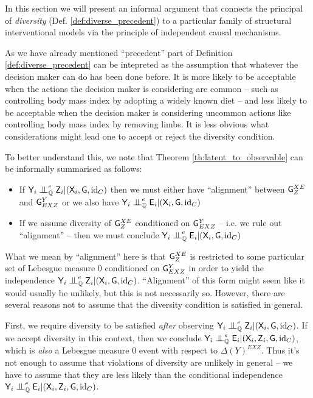 In this section we will present an informal argument that connects the principal of \emph{diversity} (Def. \ref{def:diverse_precedent}) to a particular family of structural interventional models via the principle of independent causal mechanisms.

As we have already mentioned ``precedent'' part of Definition \ref{def:diverse_precedent} can be intepreted as the assumption that whatever the decision maker can do has been done before. It is more likely to be acceptable when the actions the decision maker is considering are common -- such as controlling body mass index by adopting a widely known diet -- and less likely to be acceptable when the decision maker is considering uncommon actions like controlling body mass index by removing limbs. It is less obvious what considerations might lead one to accept or reject the diversity condition.

To better understand this, we note that Theorem \ref{th:latent_to_observable} can be informally summarised as follows:
\begin{itemize}
	\item If $\RV{Y}_i\CI^e_\prob{Q} \RV{Z}_i |(\RV{X}_i,\RV{G},\mathrm{id}_C)$ then we must either have ``alignment'' between $\mathsf{G}^{XE}_Z$ and $\mathsf{G}^{Y}_{EXZ}$ or we also have $\RV{Y}_i\CI^e_\prob{Q} \RV{E}_i |(\RV{X}_i,\RV{G},\mathrm{id}_C)$
	\item If we assume diversity of $\mathsf{G}^{XE}_Z$ conditioned on $\mathsf{G}^{Y}_{EXZ}$ -- i.e. we rule out ``alignment'' -- then we must conclude $\RV{Y}_i\CI^e_\prob{Q} \RV{E}_i |(\RV{X}_i,\RV{G},\mathrm{id}_C)$
\end{itemize}

What we mean by ``alignment'' here is that $\mathsf{G}^{XE}_Z$ is restricted to some particular set of Lebesgue measure 0 conditioned on $\mathsf{G}^{Y}_{EXZ}$ in order to yield the independence $\RV{Y}_i\CI^e_\prob{Q} \RV{Z}_i |(\RV{X}_i,\RV{G},\mathrm{id}_C)$. ``Alignment'' of this form might seem like it would usually be unlikely, but this is not necessarily so. However, there are several reasons not to assume that the diversity condition is satisfied in general. 

First, we require diversity to be satisfied \emph{after} observing $\RV{Y}_i\CI^e_\prob{Q} \RV{Z}_i |(\RV{X}_i,\RV{G},\mathrm{id}_C)$. If we accept diversity in this context, then we conclude $\RV{Y}_i\CI^e_\prob{Q} \RV{E}_i |(\RV{X}_i, \RV{Z}_i, \RV{G},\mathrm{id}_C)$, which is \emph{also} a Lebesgue measure 0 event with respect to $\Delta(Y)^{EXZ}$. Thus it's not enough to assume that violations of diversity are unlikely in general -- we have to assume that they are less likely than the conditional independence $\RV{Y}_i\CI^e_\prob{Q} \RV{E}_i |(\RV{X}_i, \RV{Z}_i, \RV{G},\mathrm{id}_C)$.

